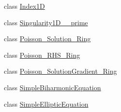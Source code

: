 \begin{CompactItemize}
class \hyperlink{classFrameTL_1_1Index1D}{Index1D}
\item 
class \hyperlink{classFrameTL_1_1Singularity1D__2__prime}{Singularity1D\_\_\-prime}
\item 
class \hyperlink{classFrameTL_1_1Poisson__Solution__Ring}{Poisson\_\-Solution\_\-Ring}
\item 
class \hyperlink{classFrameTL_1_1Poisson__RHS__Ring}{Poisson\_\-RHS\_\-Ring}
\item 
class \hyperlink{classFrameTL_1_1Poisson__SolutionGradient__Ring}{Poisson\_\-SolutionGradient\_\-Ring}
\item 
class \hyperlink{classFrameTL_1_1SimpleBiharmonicEquation}{SimpleBiharmonicEquation}
\item 
class \hyperlink{classFrameTL_1_1SimpleEllipticEquation}{SimpleEllipticEquation}
\end{CompactItemize}
